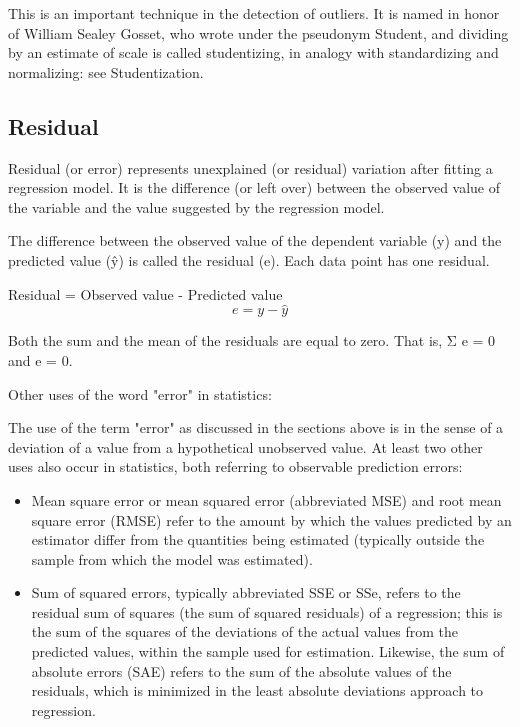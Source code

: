 \documentclass[Main.tex]{subfiles}
\begin{document}
This is an important technique in the detection of outliers. It is named in honor of William Sealey Gosset, who wrote under the pseudonym Student, and dividing by an estimate of scale is called studentizing, in analogy with standardizing and normalizing: see Studentization.




\subsection{Residual}
Residual (or error) represents unexplained (or residual) variation after fitting a regression model. It is the difference (or left over) between the observed value of the variable and the value suggested by the regression model.



The difference between the observed value of the dependent variable (y) and the predicted value (ŷ) is called the residual (e). Each data point has one residual.

Residual = Observed value - Predicted value 
\[e = y - \hat{y} \]

Both the sum and the mean of the residuals are equal to zero. That is, Σ e = 0 and e = 0.







Other uses of the word "error" in statistics: 

The use of the term "error" as discussed in the sections above is in the sense of a deviation of a value from a hypothetical unobserved value. At least two other uses also occur in statistics, both referring to observable prediction errors:

\begin{itemize}
	\item Mean square error or mean squared error (abbreviated MSE) and root mean square error (RMSE) refer to the amount by which the values predicted by an estimator differ from the quantities being estimated (typically outside the sample from which the model was estimated).
	
	\item 
	Sum of squared errors, typically abbreviated SSE or SSe, refers to the residual sum of squares (the sum of squared residuals) of a regression; this is the sum of the squares of the deviations of the actual values from the predicted values, within the sample used for estimation. Likewise, the sum of absolute errors (SAE) refers to the sum of the absolute values of the residuals, which is minimized in the least absolute deviations approach to regression.
	
\end{itemize}
\end{document}
